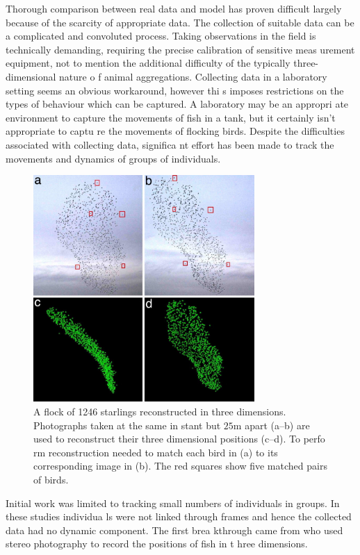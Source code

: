 Thorough comparison between real data and model has proven difficult largely because of the scarcity of
 appropriate data. The collection of suitable data can be a complicated and convoluted process. Taking 
observations in the field is technically demanding, requiring the precise calibration of sensitive meas
urement equipment, not to mention the additional difficulty of the typically three-dimensional nature o
f animal aggregations. Collecting data in a laboratory setting seems an obvious workaround, however thi
s imposes restrictions on the types of behaviour which can be captured. A laboratory may be an appropri
ate environment to capture the movements of fish in a tank, but it certainly isn't appropriate to captu
re the movements of flocking birds. Despite the difficulties associated with collecting data, significa
nt effort has been made to track the movements and dynamics of groups of individuals.

\begin{figure}[t]
	\includegraphics[width=0.75\textwidth]{ballerini_starlings.jpg}
	\caption{A flock of 1246 starlings reconstructed in three dimensions. Photographs taken at the same in
stant but $25$m apart (a--b) are used to reconstruct their three dimensional positions (c--d). To perfo
rm reconstruction \textcite{ballerini08} needed to match each bird in (a) to its corresponding image in
 (b). The red squares show five matched pairs of birds.}
	\label{fig:ballerini}
\end{figure}

Initial work was limited to tracking small numbers of individuals in groups. In these studies individua
ls were not linked through frames and hence the collected data had no dynamic component. The first brea
kthrough came from \textcite{cullen65} who used stereo photography to record the positions of fish in t
hree dimensions.

